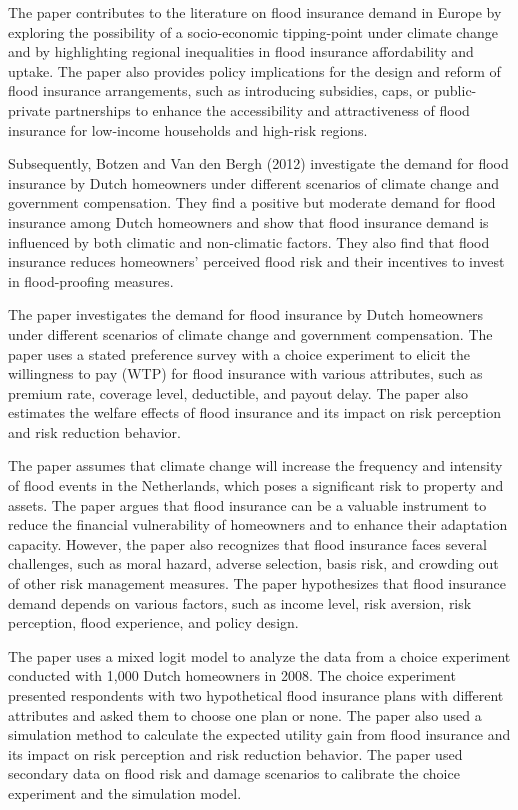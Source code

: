 \documentclass[a4paper,12pt]{article}
\begin{document}
The paper contributes to the literature on flood insurance demand in Europe by exploring the possibility of a socio-economic tipping-point under climate change and by highlighting regional inequalities in flood insurance affordability and uptake. The paper also provides policy implications for the design and reform of flood insurance arrangements, such as introducing subsidies, caps, or public-private partnerships to enhance the accessibility and attractiveness of flood insurance for low-income households and high-risk regions.

Subsequently, Botzen and Van den Bergh (2012) investigate the demand for flood insurance by Dutch homeowners under different scenarios of climate change and government compensation. They find a positive but moderate demand for flood insurance among Dutch homeowners and show that flood insurance demand is influenced by both climatic and non-climatic factors. They also find that flood insurance reduces homeowners’ perceived flood risk and their incentives to invest in flood-proofing measures.

The paper investigates the demand for flood insurance by Dutch homeowners under different scenarios of climate change and government compensation. The paper uses a stated preference survey with a choice experiment to elicit the willingness to pay (WTP) for flood insurance with various attributes, such as premium rate, coverage level, deductible, and payout delay. The paper also estimates the welfare effects of flood insurance and its impact on risk perception and risk reduction behavior.

The paper assumes that climate change will increase the frequency and intensity of flood events in the Netherlands, which poses a significant risk to property and assets. The paper argues that flood insurance can be a valuable instrument to reduce the financial vulnerability of homeowners and to enhance their adaptation capacity. However, the paper also recognizes that flood insurance faces several challenges, such as moral hazard, adverse selection, basis risk, and crowding out of other risk management measures. The paper hypothesizes that flood insurance demand depends on various factors, such as income level, risk aversion, risk perception, flood experience, and policy design.

The paper uses a mixed logit model to analyze the data from a choice experiment conducted with 1,000 Dutch homeowners in 2008. The choice experiment presented respondents with two hypothetical flood insurance plans with different attributes and asked them to choose one plan or none. The paper also used a simulation method to calculate the expected utility gain from flood insurance and its impact on risk perception and risk reduction behavior. The paper used secondary data on flood risk and damage scenarios to calibrate the choice experiment and the simulation model.
\end{document}
